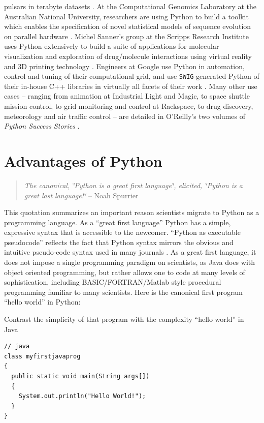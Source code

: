 pulsars in terabyte datasets \cite{Ransometal2004a,Ransom2005}. At
the Computational Genomics Laboratory at the Australian National University,
researchers are using Python to build a toolkit which enables the
specification of novel statistical models of sequence evolution on
parallel hardware \cite{Huttley2004,Butterfield2004}. Michel Sanner's
group at the Scripps Research Institute uses Python extensively to
build a suite of applications for molecular visualization and exploration
of drug/molecule interactions using virtual reality and 3D printing
technology \cite{Sanner2005a,Sanner2005b}. Engineers at Google use
Python in automation, control and tuning of their computational grid,
and use \texttt{SWIG} generated Python of their in-house C++ libraries
in virtually all facets of their work \cite{Beazley1998,Stein2005}.
Many other use cases -- ranging from animation at Industrial Light
and Magic, to space shuttle mission control, to grid monitoring and
control at Rackspace, to drug discovery, meteorology and air traffic
control -- are detailed in O'Reilly's two volumes of \emph{Python
Success Stories} \cite{PySuccess2002,PySuccess2005}.


\section{Advantages of Python}

\begin{quotation}
\textit{The canonical, \char`\"{}Python is a great first language\char`\"{},
elicited, \char`\"{}Python is a great last language!\char`\"{}} --
Noah Spurrier 
\end{quotation}
This quotation summarizes an important reason scientists migrate to
Python as a programming language. As a {}``great first language''
Python has a simple, expressive syntax that is accessible to the newcomer.
{}``Python as executable pseudocode'' reflects the fact that Python
syntax mirrors the obvious and intuitive pseudo-code syntax used in
many journals \cite{Strous2001}. As a great first language, it does
not impose a single programming paradigm on scientists, as Java does
with object oriented programming, but rather allows one to code at
many levels of sophistication, including BASIC/FORTRAN/Matlab style
procedural programming familiar to many scientists. Here is the canonical
first program {}``hello world'' in Python:

  Contrast the simplicity of that program with the complexity {}``hello
world'' in Java  {\small \begin{verbatim}
// java 
class myfirstjavaprog
{  
  public static void main(String args[])
  {
    System.out.println("Hello World!");
  }
} 
\end{verbatim}} 

